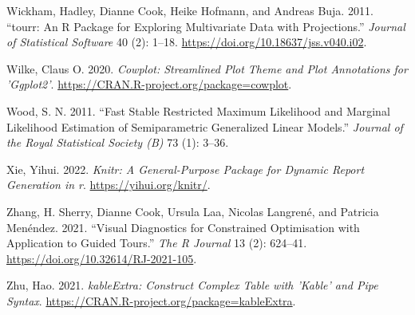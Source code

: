 \begin{CSLReferences}{1}{0}
\leavevmode{}%
Wickham, Hadley, Dianne Cook, Heike Hofmann, and Andreas Buja. 2011. {``{tourr}: An {R} Package for Exploring Multivariate Data with Projections.''} \emph{Journal of Statistical Software} 40 (2): 1--18. \url{https://doi.org/10.18637/jss.v040.i02}.

\leavevmode{}%
Wilke, Claus O. 2020. \emph{Cowplot: Streamlined Plot Theme and Plot Annotations for 'Ggplot2'}. \url{https://CRAN.R-project.org/package=cowplot}.

\leavevmode{}%
Wood, S. N. 2011. {``Fast Stable Restricted Maximum Likelihood and Marginal Likelihood Estimation of Semiparametric Generalized Linear Models.''} \emph{Journal of the Royal Statistical Society (B)} 73 (1): 3--36.

\leavevmode{}%
Xie, Yihui. 2022. \emph{Knitr: A General-Purpose Package for Dynamic Report Generation in r}. \url{https://yihui.org/knitr/}.

\leavevmode{}%
Zhang, H. Sherry, Dianne Cook, Ursula Laa, Nicolas Langrené, and Patricia Menéndez. 2021. {``Visual Diagnostics for Constrained Optimisation with Application to Guided Tours.''} \emph{The R Journal} 13 (2): 624--41. \url{https://doi.org/10.32614/RJ-2021-105}.

\leavevmode{}%
Zhu, Hao. 2021. \emph{kableExtra: Construct Complex Table with 'Kable' and Pipe Syntax}. \url{https://CRAN.R-project.org/package=kableExtra}.

\end{CSLReferences}



\address{%
Zoljargal Batsaikhan\\
Monash University\\%
Department of Econometrics and Business Statistics\\ Clayton, VIC, Australia\\
%
\url{https://github.com/zolabat}\\%
\textit{ORCiD: \href{https://orcid.org/0009-0005-0055-1448}{0009-0005-0055-1448}}\\%
\href{mailto:zoljargal11@gmail.com}{\nolinkurl{zoljargal11@gmail.com}}%
}

\address{%
Dianne Cook\\
Monash University\\%
Department of Econometrics and Business Statistics\\ Clayton, VIC, Australia\\
%
\url{http://www.dicook.org}\\%
\textit{ORCiD: \href{https://orcid.org/0000-0002-3813-7155}{0000-0002-3813-7155}}\\%
\href{mailto:dicook@monash.edu}{\nolinkurl{dicook@monash.edu}}%
}

